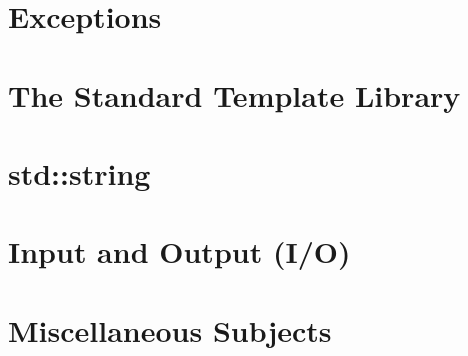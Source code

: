 \documentclass[UTF8]{ctexart}
\begin{document}
\newpage

\section{Exceptions}











\newpage

\section{The Standard Template Library}






\newpage

\section{std::string}









\newpage

\section{Input and Output (I/O)}




% 

\newpage

\section{Miscellaneous Subjects}
\end{document}
